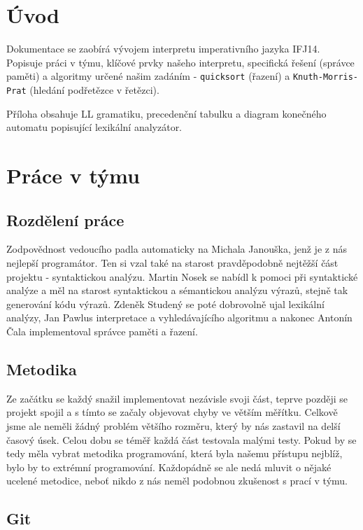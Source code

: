 ﻿\documentclass[12pt]{article}
\begin{document}
\tableofcontents
\newpage
\section{Úvod}\pagestyle{myheadings}\setcounter{page}{1}

\indent Dokumentace se zaobírá vývojem interpretu imperativního jazyka IFJ14. Popisuje práci v týmu, klíčové prvky našeho interpretu, specifická řešení (správce paměti) a algoritmy určené našim zadáním - \verb|quicksort| (řazení) a \verb|Knuth-Morris-Prat| (hledání podřetězce v řetězci). 

Příloha obsahuje LL gramatiku, precedenční tabulku a diagram konečného automatu popisující lexikální analyzátor.

\newpage
\section{Práce v týmu}
\subsection{Rozdělení práce}

Zodpovědnost vedoucího padla automaticky na Michala Janouška, jenž je z nás nejlepší programátor. Ten si vzal také na starost pravděpodobně nejtěžší část projektu - syntaktickou analýzu. Martin Nosek se nabídl k pomoci při syntaktické analýze a měl na starost syntaktickou a sémantickou analýzu výrazů, stejně tak generování kódu výrazů. Zdeněk Studený se poté dobrovolně ujal lexikální analýzy, Jan Pawlus interpretace a vyhledávajícího algoritmu a nakonec Antonín Čala implementoval správce paměti a řazení.

\subsection{Metodika}
Ze začátku se každý snažil implementovat nezávisle svoji část, teprve později se projekt spojil a s tímto se začaly objevovat chyby ve větším měřítku. Celkově jsme ale neměli žádný problém většího rozměru, který by nás zastavil na delší časový úsek. Celou dobu se téměř každá část testovala malými testy. Pokud by se tedy měla vybrat metodika programování, která byla našemu přístupu nejblíž, bylo by to extrémní programování. Každopádně se ale nedá mluvit o nějaké ucelené metodice, neboť nikdo z nás neměl podobnou zkušenost s prací v týmu.

\subsection{Git}
\end{document}
